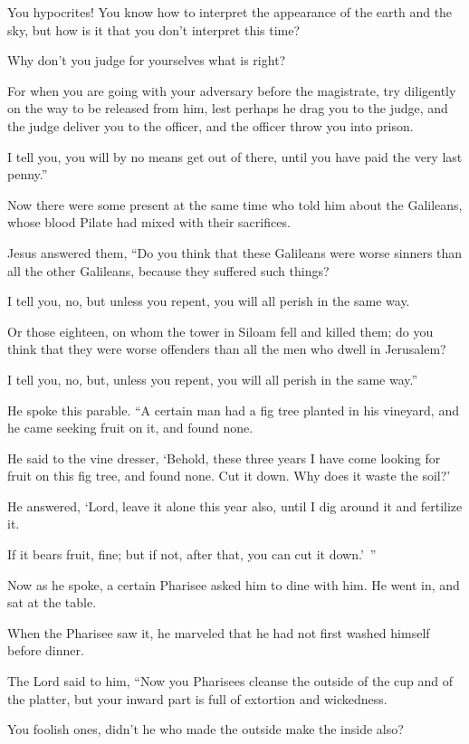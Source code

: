 You hypocrites! You know how to interpret the appearance of the earth and the sky, but how is it that you don’t interpret this time?

Why don’t you judge for yourselves what is right?

For when you are going with your adversary before the magistrate, try diligently on the way to be released from him, lest perhaps he drag you to the judge, and the judge deliver you to the officer, and the officer throw you into prison.

I tell you, you will by no means get out of there, until you have paid the very last penny.”

Now there were some present at the same time who told him about the Galileans, whose blood Pilate had mixed with their sacrifices.

Jesus answered them, “Do you think that these Galileans were worse sinners than all the other Galileans, because they suffered such things?

I tell you, no, but unless you repent, you will all perish in the same way.

Or those eighteen, on whom the tower in Siloam fell and killed them; do you think that they were worse offenders than all the men who dwell in Jerusalem?

I tell you, no, but, unless you repent, you will all perish in the same way.”

He spoke this parable. “A certain man had a fig tree planted in his vineyard, and he came seeking fruit on it, and found none.

He said to the vine dresser, ‘Behold, these three years I have come looking for fruit on this fig tree, and found none. Cut it down. Why does it waste the soil?’

He answered, ‘Lord, leave it alone this year also, until I dig around it and fertilize it.

If it bears fruit, fine; but if not, after that, you can cut it down.’ ”

Now as he spoke, a certain Pharisee asked him to dine with him. He went in, and sat at the table.

When the Pharisee saw it, he marveled that he had not first washed himself before dinner.

The Lord said to him, “Now you Pharisees cleanse the outside of the cup and of the platter, but your inward part is full of extortion and wickedness.

You foolish ones, didn’t he who made the outside make the inside also?

